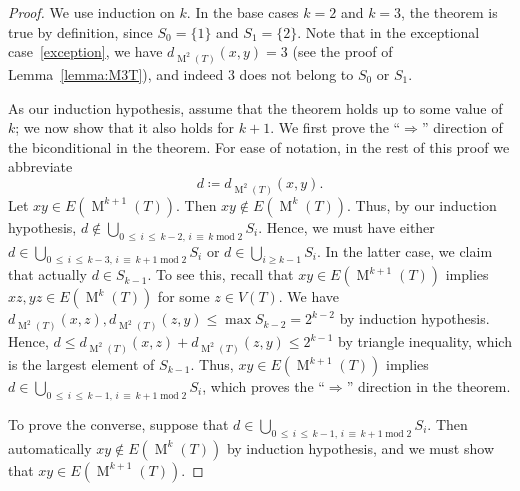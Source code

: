 \documentclass[12pt]{amsart}
\theoremstyle{definition}
\theoremstyle{remark}
\numberwithin{equation}{section}
\numberwithin{figure}{section}
\renewcommand{\mod}{\operatorname{mod}}
\newcommand{\M}{\operatorname{M}}
\newcommand{\Z}{\mathbb{Z}}
\begin{document}
\begin{proof}
    We use induction on $k$.
    In the base cases $k=2$ and $k=3$, the theorem is true by definition, since $S_0 = \{1\}$ and $S_1 = \{2\}$.
    Note that in the exceptional case~\eqref{exception}, we have $d_{\M^2(T)}(x,y) = 3$ (see the proof of Lemma~\ref{lemma:M3T}), and indeed $3$ does not belong to $S_0$ or $S_1$.

    As our induction hypothesis, assume that the theorem holds up to some value of $k$; we now show that it also holds for $k+1$.
    We first prove the ``$\Longrightarrow$'' direction of the biconditional in the theorem.
    For ease of notation, in the rest of this proof we abbreviate
    \[
    d \coloneqq d_{\M^2(T)}(x,y).
    \]
    Let $xy \in E(\M^{k+1}(T))$. Then $xy \notin E(\M^{k}(T))$. Thus, by our induction hypothesis, $d\notin \bigcup_{0\,\le\, i\, \leq\, k-2,\, i\, \equiv\, k \mod 2}  S_i$. Hence, we must have either $d\in \bigcup_{0\,\le\, i\, \leq\, k-3,\, i\, \equiv\, k+1 \mod 2}  S_i$ or $d\in \bigcup_{i\ge k-1}  S_i$.
    In the latter case, we claim that actually $d \in S_{k-1}$.
    To see this, recall that $xy \in E(\M^{k+1}(T))$ implies $xz,yz \in E(\M^{k}(T))$ for some $z\in V(T)$. 
    We have $d_{\M^2(T)}(x,z), d_{\M^2(T)}(z,y) \leq \max S_{k-2} = 2^{k-2}$ by induction hypothesis. 
    Hence, $d\le d_{\M^2(T)}(x,z)+d_{\M^2(T)}(z,y)\le 2^{k-1}$ by triangle inequality, which is the largest element of $S_{k-1}$.
    Thus, $xy \in E(\M^{k+1}(T))$ implies $d\in \bigcup_{0\,\le\, i\, \leq\, k-1,\, i\, \equiv\, k+1 \mod 2}  S_i$, which proves the ``$\Longrightarrow$'' direction in the theorem.

    To prove the converse, suppose that $d\in \bigcup_{0\,\le\, i\, \leq\, k-1,\, i\, \equiv\, k+1 \mod 2}  S_i$.
    Then automatically $xy \not\in E(\M^{k}(T))$ by induction hypothesis, and
    we must show that $xy \in E(\M^{k+1}(T))$.
    

\end{proof}
\end{document}
